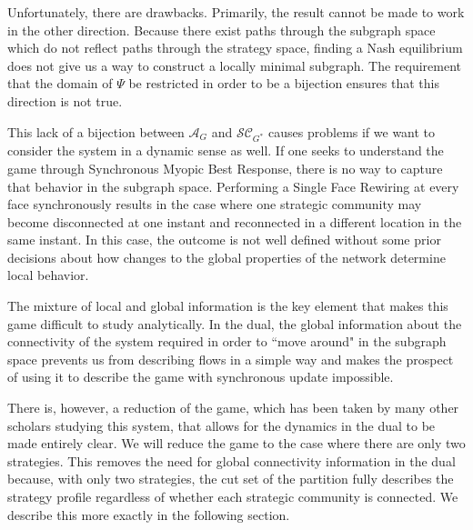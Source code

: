 \documentclass{article}
\begin{document}
    Unfortunately, there are drawbacks. Primarily, the result cannot be made to work in the other direction. Because there exist paths through the subgraph space which do not reflect paths through the strategy space, finding a Nash equilibrium does not give us a way to construct a locally minimal subgraph. The requirement that the domain of $\Psi$ be restricted in order to be a bijection ensures that this direction is not true.


    This lack of a bijection between $\mathcal{A}_G$ and $\mathcal{SC}_{G^*}$ causes problems if we want to consider the system in a dynamic sense as well. If one seeks to understand the game through Synchronous Myopic Best Response, there is no way to capture that behavior in the subgraph space. Performing a Single Face Rewiring at every face synchronously results in the case where one strategic community may become disconnected at one instant and reconnected in a different location in the same instant. In this case, the outcome is not well defined without some prior decisions about how changes to the global properties of the network determine local behavior. 
    
    The mixture of local and global information is the key element that makes this game difficult to study analytically. In the dual, the global information about the connectivity of the system required in order to  ``move around" in the subgraph space prevents us from describing flows in a simple way and makes the prospect of using it to describe the game with synchronous update impossible. 

    There is, however, a reduction of the game, which has been taken by many other scholars studying this system, that allows for the dynamics in the dual to be made entirely clear. We will reduce the game to the case where there are only two strategies. This removes the need for global connectivity information in the dual because, with only two strategies, the cut set of the partition fully describes the strategy profile regardless of whether each strategic community is connected. We describe this more exactly in the following section.
    
\end{document}
